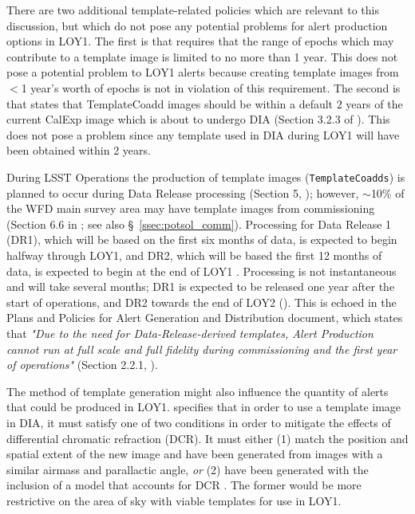 \documentclass[DM,lsstdraft,toc]{lsstdoc}
\begin{document}
There are two additional template-related policies which are relevant to this discussion, but which do not pose any potential problems for alert production options in LOY1.
The first is that  requires that the range of epochs which may contribute to a template image is limited to no more than 1 year.
This does not pose a potential problem to LOY1 alerts because creating template images from $<$1 year's worth of epochs is not in violation of this requirement.
The second is that  states that TemplateCoadd images should be within a default $2$ years of the current CalExp image which is about to undergo DIA (Section 3.2.3 of \cite{LDM-151}).
This does not pose a problem since any template used in DIA during LOY1 will have been obtained within 2 years.

During LSST Operations the production of template images ({\tt TemplateCoadds}) is planned to occur during Data Release processing (Section 5, ); however, $\sim$10\% of the WFD main survey area may have template images from commissioning (Section 6.6 in ; see also \S~\ref{ssec:potsol_comm}).
Processing for Data Release 1 (DR1), which will be based on the first six months of data, is expected to begin halfway through LOY1, and DR2, which will be based the first 12 months of data, is expected to begin at the end of LOY1 .
Processing is not instantaneous and will take several months; DR1 is expected to be released one year after the start of operations, and DR2 towards the end of LOY2 (). 
This is echoed in the Plans and Policies for Alert Generation and Distribution document, which states that {\it "Due to the need for Data-Release-derived templates, Alert Production cannot run at full scale and full fidelity during commissioning and the first year of operations"} (Section 2.2.1, ). 

The method of template generation might also influence the quantity of alerts that could be produced in LOY1.
 specifies that in order to use a template image in DIA, it must satisfy one of two conditions in order to mitigate the effects of differential chromatic refraction (DCR).
It must either (1) match the position and spatial extent of the new image and have been generated from images with a similar airmass and parallactic angle, {\em or} (2) have been generated with the inclusion of a model that accounts for DCR .
The former would be more restrictive on the area of sky with viable templates for use in LOY1.
\end{document}

